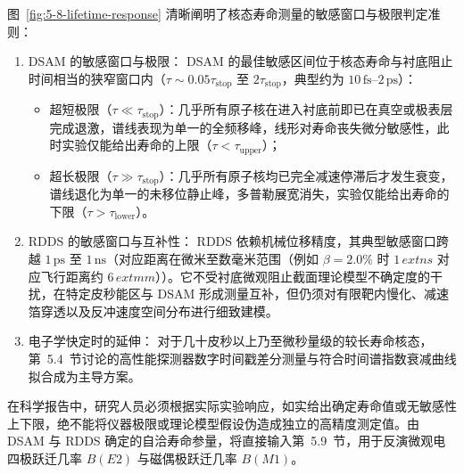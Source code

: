 图~\ref{fig:5-8-lifetime-response} 清晰阐明了核态寿命测量的敏感窗口与极限判定准则：
\begin{enumerate}
\item DSAM 的敏感窗口与极限：
DSAM 的最佳敏感区间位于核态寿命与衬底阻止时间相当的狭窄窗口内（$\tau \sim 0.05 \tau_{\mathrm{stop}}$ 至 $2 \tau_{\mathrm{stop}}$，典型约为 $10\,\text{fs}$–$2\,\text{ps}$）：
\begin{itemize}
\item 超短极限（$\tau \ll \tau_{\mathrm{stop}}$）：几乎所有原子核在进入衬底前即已在真空或极表层完成退激，谱线表现为单一的全频移峰，线形对寿命丧失微分敏感性，此时实验仅能给出寿命的上限（$\tau < \tau_{\mathrm{upper}}$）；
\item 超长极限（$\tau \gg \tau_{\mathrm{stop}}$）：几乎所有原子核均已完全减速停滞后才发生衰变，谱线退化为单一的未移位静止峰，多普勒展宽消失，实验仅能给出寿命的下限（$\tau > \tau_{\mathrm{lower}}$）。
\end{itemize}
\item RDDS 的敏感窗口与互补性：
RDDS 依赖机械位移精度，其典型敏感窗口跨越 $1\,\text{ps}$ 至 $1\,\text{ns}$（对应距离在微米至数毫米范围（例如 $\beta = 2.0\%$ 时 $1\,	ext{ns}$ 对应飞行距离约 $6\,	ext{mm}$））。它不受衬底微观阻止截面理论模型不确定度的干扰，在特定皮秒能区与 DSAM 形成测量互补，但仍须对有限靶内慢化、减速箔穿透以及反冲速度空间分布进行细致建模。
\item 电子学快定时的延伸：
对于几十皮秒以上乃至微秒量级的较长寿命核态，第~5.4~节讨论的高性能探测器数字时间戳差分测量与符合时间谱指数衰减曲线拟合成为主导方案。
\end{enumerate}

在科学报告中，研究人员必须根据实际实验响应，如实给出确定寿命值或无敏感性上下限，绝不能将仪器极限或理论模型假设伪造成独立的高精度测定值。由 DSAM 与 RDDS 确定的自洽寿命参量，将直接输入第~5.9~节，用于反演微观电四极跃迁几率 $B(E2)$ 与磁偶极跃迁几率 $B(M1)$。
